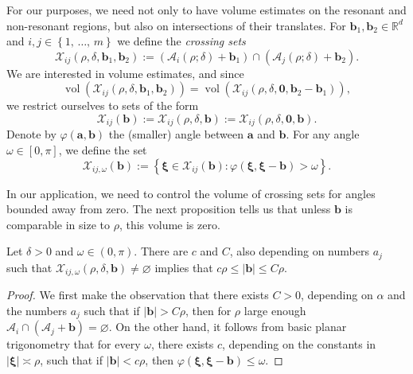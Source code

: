\documentclass[10pt]{amsart}
\theoremstyle{definition}\newtheorem{defi}[theo]{Definition}\newtheorem{rema}[theo]{Remark}\newtheorem{exam}[theo]{Example}\newtheorem{nota}[theo]{Notation}
\DeclareMathOperator{\vol}{vol}
\newcommand{\R}{\mathbb R}
\newcommand{\CA}{\mathcal{A}}
\newcommand{\CX}{\mathcal{X}}
\newcommand{\bxi}{\boldsymbol \xi}
\newcommand{\bzero}{\boldsymbol 0}
\newcommand{\ba}{\mathbf a}
\newcommand{\bb}{\mathbf b}
\newcommand{\bbb}{\mathbf b}
\renewcommand{\phi}{\varphi}
\newcommand{\abs}[1]{\left\lvert #1 \right\rvert}
\newcommand{\set}[1]{\left\{ #1 \right\}}
\begin{document}
For our purposes, we need not only to have volume estimates on the resonant and non-resonant regions, but also on intersections of their translates. For $\bb_1,\bb_2 \in \R^d$ and $i,j \in \set{1,\,\dotsc,\,m}$ we define the
\emph{crossing sets}
\begin{equation}\label{eq:defCX}
\CX_{ij}(\rho,\delta,\bb_1,\bb_2) := (\CA_i(\rho;\delta)+\bb_1)\cap(\CA_j(\rho;\delta)+\bb_2).
\end{equation}
We are interested in volume estimates, and since
\begin{equation}
\vol(\CX_{ij}(\rho,\delta,\bb_1,\bb_2)) =
\vol(\CX_{ij}(\rho,\delta,\bzero,\bb_2-\bb_1)),
\end{equation}
we restrict ourselves to sets of the form
\begin{equation}
\CX_{ij}(\bb) := \CX_{ij}(\rho,\delta,\bb) :=
\CX_{ij}(\rho,\delta,\bzero,\bb).
\end{equation}
Denote by $\phi(\ba,\bb)$ the (smaller) angle between $\ba$ and $\bb$. For any angle $\omega \in [0,\pi]$, we define the set
\begin{equation}\label{eq:badvol}
\CX_{ij,\omega}(\bb) := \set{\bxi \in \CX_{ij}(\bb) : \phi(\bxi,\bxi-\bb) >
\omega}.
\end{equation}

In our application, we need to control the volume of crossing sets for angles bounded away from zero. The next proposition tells us that unless $\bbb$ is comparable in size to $\rho$, this volume is zero.
\begin{prop}\label{rem:xemptyint}
Let $\delta > 0$ and $\omega \in (0,\pi)$. There are $c$ and $C$, also depending on numbers $a_j$ such that $\CX_{ij,\omega}(\rho,\delta,\bb) \ne \varnothing$ implies that $c \rho \le \abs\bb \le C\rho$.
\end{prop}

\begin{proof}
We first make the observation that there exists $C > 0$, depending on $\alpha$ and the numbers $a_j$ such that if $\abs \bbb > C\rho$, then for $\rho$ large enough $\CA_i \cap (\CA_j + \bbb) = \varnothing$. On the other hand, it follows from basic planar trigonometry that for every $\omega$, there exists $c$, depending on the constants in $\abs\bxi \asymp \rho$, such that if $\abs \bbb < c \rho$, then $\phi(\bxi, \bxi-\bbb)\le \omega$.
\end{proof}
\end{document}
